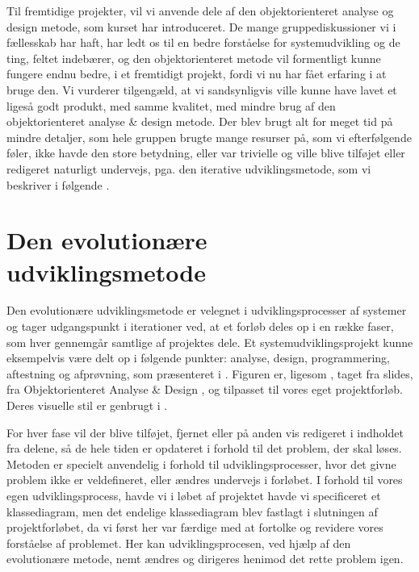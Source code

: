 Til fremtidige projekter, vil vi anvende dele af den objektorienteret analyse og design metode, som kurset har introduceret. De mange gruppediskussioner vi i fællesskab har haft, har ledt os til en bedre forståelse for systemudvikling og de ting, feltet indebærer, og den objektorienteret metode vil formentligt kunne fungere endnu bedre, i et fremtidigt projekt, fordi vi nu har fået erfaring i at bruge den. Vi vurderer tilgengæld, at vi sandsynligvis ville kunne have lavet et ligeså godt produkt, med samme kvalitet, med mindre brug af den objektorienteret analyse \& design metode. Der blev brugt alt for meget tid på mindre detaljer, som hele gruppen brugte mange resurser på, som vi efterfølgende føler, ikke havde den store betydning, eller var trivielle og ville blive tilføjet eller redigeret naturligt undervejs, pga. den iterative udviklingsmetode, som vi beskriver i følgende .


\section{Den evolutionære udviklingsmetode}
\label{sec:akadmiskevolutionaeremetode}

Den evolutionære udviklingsmetode er velegnet i udviklingsprocesser af systemer og tager udgangspunkt i iterationer ved, at et forløb deles op i en række faser, som hver gennemgår samtlige af projektes dele. Et systemudviklingsprojekt kunne eksempelvis være delt op i følgende punkter: analyse, design, programmering, aftestning og afprøvning, som præsenteret i . Figuren er, ligesom , taget fra slides, fra Objektorienteret Analyse \& Design \cite{ooadslide}, og tilpasset til vores eget projektforløb. Deres visuelle stil er genbrugt i .

For hver fase vil der blive tilføjet, fjernet eller på anden vis redigeret i indholdet fra delene, så de hele tiden er opdateret i forhold til det problem, der skal løses. 
Metoden er specielt anvendelig i forhold til udviklingsprocesser, hvor det givne problem ikke er veldefineret, eller ændres undervejs i forløbet. 
I forhold til vores egen udviklingsprocess, havde vi i løbet af projektet havde vi specificeret et klassediagram, men det endelige klassediagram blev fastlagt i slutningen af projektforløbet, da vi først her var færdige med at fortolke og revidere vores forståelse af problemet.
Her kan udviklingsprocesen, ved hjælp af den evolutionære metode, nemt ændres og dirigeres henimod det rette problem igen.

